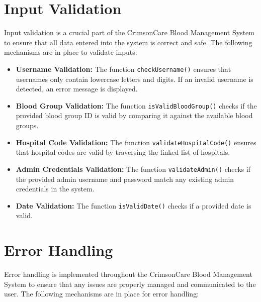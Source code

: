 \documentclass[12pt,a4paper]{report}
\begin{document}
\section{Input Validation}
Input validation is a crucial part of the CrimsonCare Blood Management System to ensure that all data
entered into the system is correct and safe. The following mechanisms are in place to validate inputs:

\begin{itemize}
    \item \textbf{Username Validation:} The function \texttt{checkUsername()} ensures that usernames only contain lowercase letters and digits. If an invalid username is detected, an error message is displayed.
    \item \textbf{Blood Group Validation:} The function \texttt{isValidBloodGroup()} checks if the provided blood group ID is valid by comparing it against the available blood groups.
    \item \textbf{Hospital Code Validation:} The function \texttt{validateHospitalCode()} ensures that hospital codes are valid by traversing the linked list of hospitals.
    \item \textbf{Admin Credentials Validation:} The function \texttt{validateAdmin()} checks if the provided admin username and password match any existing admin credentials in the system.
    \item \textbf{Date Validation:} The function \texttt{isValidDate()} checks if a provided date is valid.
\end{itemize}

\section{Error Handling}
Error handling is implemented throughout the CrimsonCare Blood Management System to ensure that any issues are properly managed and communicated to the user. The following mechanisms are in place for error handling:
\end{document}
